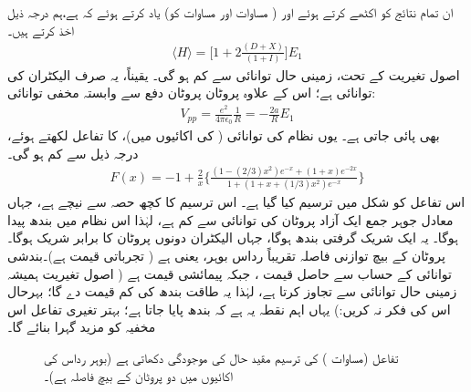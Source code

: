  ان تمام نتائج کو اکٹھے کرتے ہوئے اور ( مساوات   اور مساوات   کو)  یاد  کرتے
   ہوئے کہ   ہے،ہم درجہ ذیل اخذ کرتے ہیں۔
\begin{align}
\langle H \rangle =\big[1+2\frac{(D+X)}{(1+I)}\big]E_{1} 
\end{align}
 اصول تغیریت کے تحت،   زمینی حال توانائی    سے کم ہو  گی۔ یقیناً،  یہ صرف الیکٹران کی توانائی ہے؛ اس کے علاوہ  پروٹان پروٹان دفع سے وابستہ مخفی توانائی:
\begin{align}
V_{pp}=\frac{e^{2}}{4\pi\epsilon_{0}}\frac{1}{R}=-\frac{2a}{R}E_{1} 
\end{align}
 بھی پائی جاتی ہے۔  یوں نظام کی    توانائی   (   کی اکائیوں میں)،       کا تفاعل لکھتے ہوئے،  درجہ ذیل سے کم ہو گی۔
 \begin{align}\label{مساوات_تغیریت_کل_توانائی_اس_سے_کم}
F(x)=-1+\frac{2}{x}\Big\{\frac{(1-(2/3)x^{2})e^{-x}+(1+x)e^{-2x}}{1+(1+x+(1/3)x^{2})e^{-x}}\Big\} 
\end{align}
 اس تفاعل کو شکل   میں ترسیم کیا گیا ہے۔ اس ترسیم کا کچھ حصہ  سے نیچے ہے،  جہاں معادل جوہر جمع ایک آزاد پروٹان کی 
 توانائی  سے  کم ہے،  لہٰذا اس نظام میں بندھ پیدا ہوگا۔ یہ ایک شریک گرفتی بندھ  ہوگا، جہاں الیکٹران  دونوں پروٹان کا   برابر شریک  ہوگا۔ پروٹان کے بیچ   توازنی فاصلہ تقریباً   رداس بوہر،  یعنی     ہے ( تجرباتی قیمت   ہے)۔بندشی  توانائی  کے  حساب سے حاصل قیمت  ،  جبکہ پیمائشی قیمت   ہے (  اصول تغیریت ہمیشہ زمینی حال توانائی سے تجاوز کرتا ہے،  لہٰذا یہ طاقت بندھ  کی کم  قیمت  دے گا؛  بہرحال اس کی فکر نہ کریں:)  یہاں اہم نقطہ یہ  ہے کہ بندھ  پایا جاتا ہے؛  بہتر  تغیری  تفاعل اس مخفیہ کو مزید گہرا بنائے  گا۔
\begin{figure} \centering
{} 
\caption{تفاعل  (مساوات ) کی ترسیم مقید حال کی موجودگی دکھاتی ہے (بوہر رداس کی اکائیوں میں  دو پروٹان کے بیچ فاصلہ ہے)۔ } 
\label{شکل_تغیریت_مقید_حال} 
\end{figure} 

